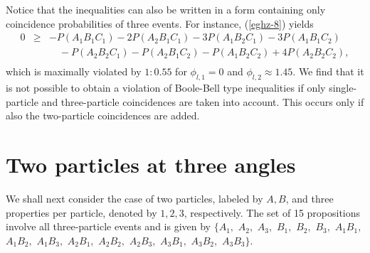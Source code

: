 Notice that the inequalities can also be written in a form containing only
coincidence probabilities of three events.
For instance, (\ref{eghz-8}) yields
\begin{eqnarray}
0 &\ge&
 - P(A_1B_1C_1) - 2P(A_2B_1C_1) - 3P(A_1B_2C_1) - 3P(A_1B_1C_2)
\nonumber\\&&\quad
- P(A_2B_2C_1) - P(A_2B_1C_2) - P(A_1B_2C_2) + 4P(A_2B_2C_2),
\nonumber\\&&\quad
\label{eghz-7a}
\end{eqnarray}
which is maximally violated by $1:0.55$ for $\phi_{l,1}=0$ and
$\phi_{l,2}  \approx 1.45$.
We find that it is not possible to obtain  a violation of Boole-Bell type inequalities
if only  single-particle and three-particle coincidences are taken into account.
This occurs only if also the two-particle coincidences are added.


\section{Two particles at three angles}

We shall next consider the case of two particles, labeled by
$A,B$,
and three properties per particle, denoted by $1,2,3$, respectively.
The set of 15 propositions involve all three-particle events and is given by
$\{
 A_1        ,$ $
 A_2        ,$ $
 A_3        ,$ $
 B_1        ,$ $
 B_2        ,$ $
 B_3        ,$ $
 A_1B_1     ,$ $
 A_1B_2     ,$ $
 A_1B_3     ,$ $
 A_2B_1     ,$ $
 A_2B_2     ,$ $
 A_2B_3     ,$ $
 A_3B_1     ,$ $
 A_3B_2     ,$ $
 A_3B_3
\}$.

